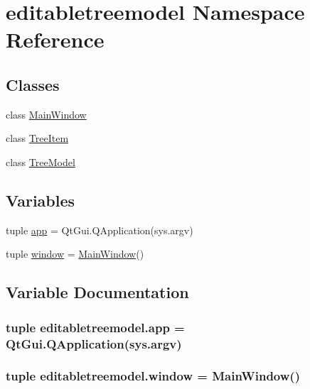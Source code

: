 \hypertarget{namespaceeditabletreemodel}{}\section{editabletreemodel Namespace Reference}
\label{namespaceeditabletreemodel}
\subsection*{Classes}
\begin{DoxyCompactItemize}
\item 
class \hyperlink{classeditabletreemodel_1_1MainWindow}{Main\+Window}
\item 
class \hyperlink{classeditabletreemodel_1_1TreeItem}{Tree\+Item}
\item 
class \hyperlink{classeditabletreemodel_1_1TreeModel}{Tree\+Model}
\end{DoxyCompactItemize}
\subsection*{Variables}
\begin{DoxyCompactItemize}
\item 
tuple \hyperlink{namespaceeditabletreemodel_a20020d82b9d0e1476473b6bcd14be170}{app} = Qt\+Gui.\+Q\+Application(sys.\+argv)
\item 
tuple \hyperlink{namespaceeditabletreemodel_a88b60620c31ab52d79433ba7de87a153}{window} = \hyperlink{classeditabletreemodel_1_1MainWindow}{Main\+Window}()
\end{DoxyCompactItemize}


\subsection{Variable Documentation}
\hypertarget{namespaceeditabletreemodel_a20020d82b9d0e1476473b6bcd14be170}{}
\subsubsection[{app}]{\setlength{\rightskip}{0pt plus 5cm}tuple editabletreemodel.\+app = Qt\+Gui.\+Q\+Application(sys.\+argv)}\label{namespaceeditabletreemodel_a20020d82b9d0e1476473b6bcd14be170}
\hypertarget{namespaceeditabletreemodel_a88b60620c31ab52d79433ba7de87a153}{}
\subsubsection[{window}]{\setlength{\rightskip}{0pt plus 5cm}tuple editabletreemodel.\+window = {\bf Main\+Window}()}\label{namespaceeditabletreemodel_a88b60620c31ab52d79433ba7de87a153}
